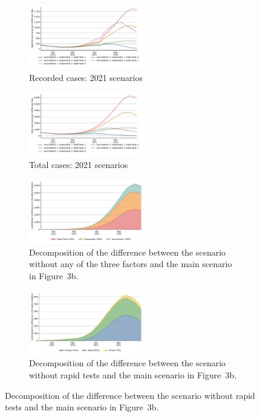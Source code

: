 \documentclass[varwidth, border=10pt, class=wlscirep, 10pt]{standalone}
\begin{document}
\begin{figure}
    \centering

    \begin{subfigure}[b]{6cm}
        \centering
        \includegraphics[width=5cm]{../figures/results/figures/scenario_comparisons/effect_of_channels_on_pessimistic_scenario/full_new_known_case}
        \caption{{Recorded cases: 2021 scenarios}}
        \label{fig:2021_scenarios_recorded}
    \end{subfigure}
    \hfill
    \begin{subfigure}[b]{6cm}
        \centering
        \includegraphics[width=5cm]{../figures/results/figures/scenario_comparisons/effect_of_channels_on_pessimistic_scenario/full_newly_infected}
        \caption{{Total cases: 2021 scenarios}}
        \label{fig:2021_scenarios_newly_infected}
    \end{subfigure}

    \begin{subfigure}[b]{6cm}
        \centering
        \includegraphics[width=5cm]{../figures/results/figures/full_decomposition_channels_area}
        \caption{Decomposition of the difference between the scenario without any of the
            three factors and the main scenario in
            Figure~3b.}
        \label{fig:2021_scenarios_decomposition}
    \end{subfigure}
    \hfill
    \begin{subfigure}[b]{6cm}
        \centering
        \includegraphics[width=5cm]{../figures/results/figures/full_decomposition_rapid_tests_area}
        \caption{Decomposition of the difference between the scenario without rapid
            tests and the main scenario in
            Figure~3b.}
        \label{fig:2021_scenarios_decomposition_tests}
    \end{subfigure}
\end{figure}
\end{document}
